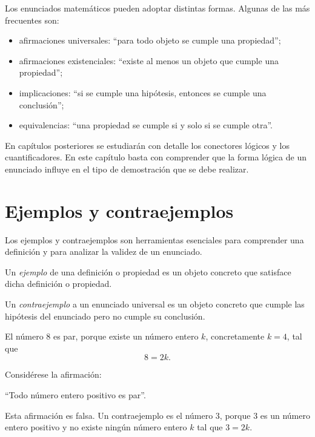 Los enunciados matemáticos pueden adoptar distintas formas. Algunas de las más frecuentes son:

\begin{itemize}
  \item afirmaciones universales: ``para todo objeto se cumple una propiedad'';
  \item afirmaciones existenciales: ``existe al menos un objeto que cumple una propiedad'';
  \item implicaciones: ``si se cumple una hipótesis, entonces se cumple una conclusión'';
  \item equivalencias: ``una propiedad se cumple si y solo si se cumple otra''.
\end{itemize}

\begin{advertencia}
En capítulos posteriores se estudiarán con detalle los conectores lógicos y los cuantificadores. En este capítulo basta con comprender que la forma lógica de un enunciado influye en el tipo de demostración que se debe realizar.
\end{advertencia}

\section{Ejemplos y contraejemplos}
\label{sec:ejemplos-contraejemplos}

Los ejemplos y contraejemplos son herramientas esenciales para comprender una definición y para analizar la validez de un enunciado.

\begin{definicion}[Ejemplo]
Un \emph{ejemplo} de una definición o propiedad es un objeto concreto que satisface dicha definición o propiedad.
\end{definicion}

\begin{definicion}[Contraejemplo]
Un \emph{contraejemplo} a un enunciado universal es un objeto concreto que cumple las hipótesis del enunciado pero no cumple su conclusión.
\end{definicion}

\begin{ejemplo}
El número \(8\) es par, porque existe un número entero \(k\), concretamente \(k=4\), tal que
\[
  8 = 2k.
\]
\end{ejemplo}

\begin{ejemplo}[Contraejemplo]
Considérese la afirmación:

``Todo número entero positivo es par''.

Esta afirmación es falsa. Un contraejemplo es el número \(3\), porque \(3\) es un número entero positivo y no existe ningún número entero \(k\) tal que \(3=2k\).
\end{ejemplo}

